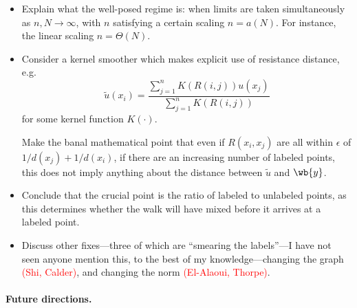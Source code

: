\documentclass{article}
\newcommand{\1}{\mathbf{1}}
\newcommand{\wt}[1]{\widetilde{#1}}
\theoremstyle{definition}
\theoremstyle{remark}
\begin{document}
\begin{itemize}
	\item Explain what the well-posed regime is: when limits are taken simultaneously as $n,N \to \infty$, with $n$ satisfying a certain scaling $n = a(N)$. For instance, the linear scaling $n = \Theta(N)$. 
	\item Consider a kernel smoother which makes explicit use of resistance distance, e.g.
	\begin{equation*}
	\wt{u}(x_i) = \frac{\sum_{j = 1}^{n} K(R(i,j)) u(x_j)}{\sum_{j = 1}^{n} K(R(i,j))}
	\end{equation*}
	for some kernel function $K(\cdot)$.
	
	Make the banal mathematical point that even if $R(x_i,x_j)$ are all within $\epsilon$ of $1/d(x_j) + 1/d(x_i)$, if there are an increasing number of labeled points, this does not imply anything about the distance between $\wt{u}$ and $\wb{y}$.
	\item Conclude that the crucial point is the ratio of labeled to unlabeled points, as this determines whether the walk will have mixed before it arrives at a labeled point.
	\item Discuss other fixes---three of which are ``smearing the labels''---I have not seen anyone mention this, to the best of my knowledge---changing the graph \textcolor{red}{(Shi, Calder)}, and changing the norm \textcolor{red}{(El-Alaoui, Thorpe)}. 
\end{itemize}


\paragraph{Future directions.}
\end{document}
